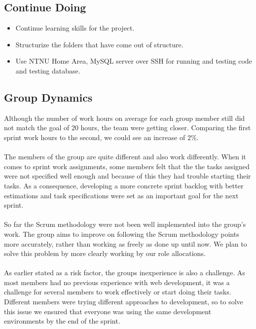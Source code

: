 \subsection{Continue Doing}
\label{subsec:S2RetrospectiveContinue}
\begin{itemize}
\item Continue learning skills for the project.
\item Structurize the folders that have come out of structure. 
\item Use NTNU Home Area, MySQL server over SSH for running and testing code and testing database.
\end{itemize}

\subsection{Group Dynamics}
\label{subsec:S2RetrospectiveDynamics}

Although the number of work hours on average for each group member still did not match the goal of 20 hours, the team were getting closer. Comparing the first sprint work hours to the second, we could see an increase of 2\%.

\paragraph{} The members of the group are quite different and also work differently. When it comes to sprint work assignments, some members felt that the the tasks assigned were not specified well enough and because of this they had trouble starting their tasks. As a consequence, developing a more concrete sprint backlog with better estimations and task specifications were set as an important goal for the next sprint.

\paragraph{} So far the Scrum methodology were not been well implemented into the group's work. The group aims to improve on following the Scrum methodology points more accurately, rather than working as freely as done up until now. We plan to solve this problem by more clearly working by our role allocations.

\paragraph{} As earlier stated as a risk factor, the groups inexperience is also a challenge. As most members had no previous experience with web development, it was a challenge for several members to work effectively or start doing their tasks. Different members were trying different approaches to development, so to solve this issue we ensured that everyone was using the same development environments by the end of the sprint. 

